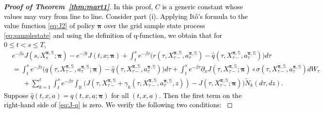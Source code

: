 \documentclass[11pt]{article}
\newcommand{\1}{\mathbbm{1}}
\newcommand{\bpi}{\boldsymbol{\pi}}
\newcommand{\rev}[1]{\textcolor{black}{{#1}}} %
\begin{document}

\begin{proof}[\bf Proof of Theorem~\ref{thm:mart1}]
\rev{In this proof, $C$ is a generic constant whose values may vary from line to line. Consider part (i). Applying It\^{o}'s formula to the value function \eqref{eq:J2} of policy $\boldsymbol{\pi}$ over the grid sample state process \eqref{eq:samplestate}
and
using the definition of q-function, we obtain that for $0 \le t < s \le T$,
\begin{align}
	& e^{-\beta s}  J(s,  X_{s}^{\boldsymbol{\pi}, \mathbb{S}}; \boldsymbol{\pi}) - e^{-\beta t}   J(t,  x; \boldsymbol{\pi}) +  \int_t^s e^{-\beta \tau}  \big( r(\tau, X_{\tau-}^{\boldsymbol{\pi}, \mathbb{S}}, a_\tau^{\boldsymbol{\pi}, \mathbb{S}}) -  \hat q(\tau,  X_{\tau-}^{\boldsymbol{\pi}, \mathbb{S}}, a_\tau^{\boldsymbol{\pi}, \mathbb{S}}) \big)d\tau \nonumber  \\
	& =    \int_t^s e^{-\beta \tau}   \big(  q(\tau,  X_{\tau-}^{\boldsymbol{\pi}, \mathbb{S}}, a_\tau^{\boldsymbol{\pi}, \mathbb{S}}; \boldsymbol{\pi}) -  \hat  q(\tau,  X_{\tau-}^{\boldsymbol{\pi}, \mathbb{S}}, a_\tau^{\boldsymbol{\pi}, \mathbb{S}}) \big)  d\tau +   \int_t^s  e^{-\beta \tau} \partial_xJ(\tau,  X_{\tau-}^{\boldsymbol{\pi}, \mathbb{S}};   \boldsymbol{\pi} ) \circ {\sigma}(\tau,  X^{\boldsymbol{\pi}, \mathbb{S} }_{\tau-}, a^{\boldsymbol{\pi}, \mathbb{S} }_\tau ) dW_\tau \nonumber  \\
	& \phantom{=~} +  \sum_{k=1}^\ell \int_t^s e^{-\beta \tau} \int_{\mathbb{R}} \big( J (\tau,   X^{\boldsymbol{\pi}, \mathbb{S}}_{\tau-} + {\gamma}_k( \tau,X^{\boldsymbol{\pi}, \mathbb{S} }_{\tau-} , a_\tau^{\boldsymbol{\pi}, \mathbb{S}},z)) -  J(\tau,X^{\boldsymbol{\pi}, \mathbb{S}}_{\tau-}; \boldsymbol{\pi})  \big)  \widetilde{ N}_k(d\tau, dz). \label{eq:J-q}
\end{align}
Suppose $\hat q(t,x, a) = q(t,x, a; \boldsymbol{\pi})$ for all $(t,x,a)$. Then the first term on the right-hand side of \eqref{eq:J-q} is zero. We verify the following two conditions:
}
\end{proof}
\end{document}
